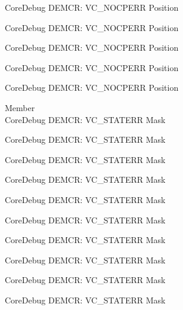 \begin{DoxyRefList}
\label{deprecated__deprecated000868}%
%
Core\+Debug DEMCR\+: VC\+\_\+\+NOCPERR Position 

\label{deprecated__deprecated001010}%
%
Core\+Debug DEMCR\+: VC\+\_\+\+NOCPERR Position 

\label{deprecated__deprecated001086}%
%
Core\+Debug DEMCR\+: VC\+\_\+\+NOCPERR Position 

\label{deprecated__deprecated001175}%
%
Core\+Debug DEMCR\+: VC\+\_\+\+NOCPERR Position 

\label{deprecated__deprecated001277}%
%
Core\+Debug DEMCR\+: VC\+\_\+\+NOCPERR Position  
\item[Member \doxylink{group___c_m_s_i_s___core_debug_gaa38b947d77672c48bba1280c0a642e19}{Core\+Debug\+\_\+\+DEMCR\+\_\+\+VC\+\_\+\+STATERR\+\_\+\+Msk} ]\hfill \\
\label{deprecated__deprecated000062}%
%
Core\+Debug DEMCR\+: VC\+\_\+\+STATERR Mask 

\label{deprecated__deprecated000206}%
%
Core\+Debug DEMCR\+: VC\+\_\+\+STATERR Mask 

\label{deprecated__deprecated000348}%
%
Core\+Debug DEMCR\+: VC\+\_\+\+STATERR Mask 

\label{deprecated__deprecated000424}%
%
Core\+Debug DEMCR\+: VC\+\_\+\+STATERR Mask 

\label{deprecated__deprecated000513}%
%
Core\+Debug DEMCR\+: VC\+\_\+\+STATERR Mask 

\label{deprecated__deprecated000615}%
%
Core\+Debug DEMCR\+: VC\+\_\+\+STATERR Mask 

\label{deprecated__deprecated000721}%
%
Core\+Debug DEMCR\+: VC\+\_\+\+STATERR Mask 

\label{deprecated__deprecated000865}%
%
Core\+Debug DEMCR\+: VC\+\_\+\+STATERR Mask 

\label{deprecated__deprecated001007}%
%
Core\+Debug DEMCR\+: VC\+\_\+\+STATERR Mask 

\label{deprecated__deprecated001083}%
%
Core\+Debug DEMCR\+: VC\+\_\+\+STATERR Mask 


\end{DoxyRefList}
